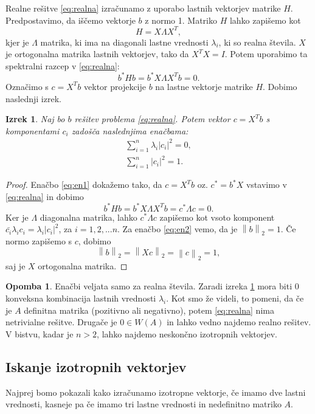 \documentclass[12pt,a4paper]{amsart}
\theoremstyle{definition}
\newtheorem{opomba}[definicija]{Opomba}
\theoremstyle{plain}
\newtheorem{izrek}[definicija]{Izrek}
\newcommand{\abs}[1]{ \left\lvert#1\right\rvert}
\newcommand{\norm}[1]{\left\lVert#1\right\rVert}
\begin{document}
Realne rešitve \eqref{eq:realna} izračunamo z uporabo lastnih vektorjev matrike $H$. Predpostavimo, da iščemo vektorje $b$ z normo 1. Matriko $H$ lahko zapišemo kot $$H=X\Lambda X^T,$$ kjer je $\Lambda$ matrika, ki ima na diagonali lastne vrednosti $\lambda_i$, ki so realna števila. $X$ je ortogonalna matrika lastnih vektorjev, tako da $X^T X=I$. Potem uporabimo ta spektralni razcep v \eqref{eq:realna}: $$b^\ast Hb=b^\ast X\Lambda X^T b=0.$$ Označimo s $c=X^Tb$ vektor projekcije $b$ na lastne vektorje matrike $H$. Dobimo naslednji izrek.
\begin{izrek} \label{izrek2}
Naj bo $b$ rešitev problema \eqref{eq:realna}. Potem vektor $c=X^T b$ s komponentami $c_i$ zadošča naslednjima enačbama:
\begin{align}
\sum_{i=1}^{n} \lambda_i \abs{c_i}^2=0 \label{eq:en1},\\
\sum_{i=1}^{n}\abs{c_i}^2=1. \label{eq:en2}
\end{align}
\end{izrek}
\begin{proof}
Enačbo \eqref{eq:en1}  dokažemo tako, da $c=X^Tb$ oz. $c^\ast =b^\ast X$ vstavimo v \eqref{eq:realna} in dobimo $$b^\ast Hb=b^\ast X\Lambda X^T b= c^\ast \Lambda c=0.$$ Ker je $\Lambda$ diagonalna matrika, lahko $c^\ast \Lambda c$ zapišemo kot vsoto komponent $\bar{c_i}\lambda_i c_i=\lambda_i\abs{c_i}^2$, za $i=1,2,...n$.
Za enačbo \eqref{eq:en2} vemo, da je $\norm{b}_2=1$. Če normo zapišemo s $c$, dobimo $$\norm{b}_2=\norm{Xc}_2=\norm{c}_2=1,$$ saj je $X$ ortogonalna matrika.

\end{proof}
\begin{opomba}
Enačbi veljata samo za realna števila. Zaradi  izreka \ref{izrek2} mora biti 0 konveksna kombinacija lastnih vrednosti $\lambda_i$. Kot smo že videli, to pomeni, da če je $A$ definitna matrika (pozitivno ali negativno), potem \eqref{eq:realna}
nima netrivialne rešitve. Drugače je $0 \in W(A)$ in lahko vedno najdemo realno rešitev. V bistvu, kadar je $n>2$, lahko najdemo neskončno izotropnih vektorjev.
\end{opomba}
\subsection{Iskanje izotropnih vektorjev}
Najprej bomo pokazali kako izračunamo i\-zo\-trop\-ne vektorje, če imamo dve lastni vrednosti, kasneje pa če imamo tri lastne vrednosti in nedefinitno matriko $A$.\\
\end{document}
